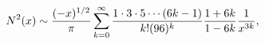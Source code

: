 \[{\mathop{N\/}\nolimits^{2}}\!\left(x\right)\sim\frac{(-x)^{1/2}}{\pi}\sum_{k=0%
}^{\infty}\frac{1\cdot 3\cdot 5\cdots(6k-1)}{k!(96)^{k}}\frac{1+6k}{1-6k}\frac%
{1}{x^{3k}},\]